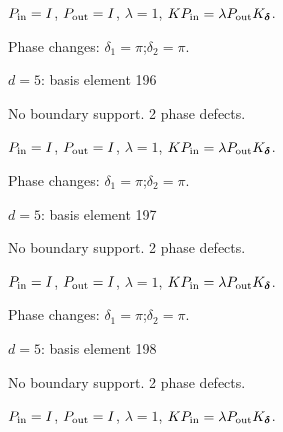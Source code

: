 \vspace{-1mm}
$P_{\rm in}=I$, \quad $P_{\rm out}=I$, \quad $\lambda=1$, \qquad $K P_{\rm in}=\lambda P_{\rm out}K_{\boldsymbol\delta}$.
\par\smallskip\begin{minipage}{.98\linewidth}\small Phase changes: $\delta_{1}=\pi$;\quad $\delta_{2}=\pi$.\end{minipage}
\vfill
{\footnotesize\texttt{}}
\newpage
{}
{\Large $d=5$: basis element 196}\par
No boundary support. 2 phase defects.
\begin{center}
\end{center}
\vspace{-1mm}
$P_{\rm in}=I$, \quad $P_{\rm out}=I$, \quad $\lambda=1$, \qquad $K P_{\rm in}=\lambda P_{\rm out}K_{\boldsymbol\delta}$.
\par\smallskip\begin{minipage}{.98\linewidth}\small Phase changes: $\delta_{1}=\pi$;\quad $\delta_{2}=\pi$.\end{minipage}
\vfill
{\footnotesize\texttt{}}
\newpage
{}
{\Large $d=5$: basis element 197}\par
No boundary support. 2 phase defects.
\begin{center}
\end{center}
\vspace{-1mm}
$P_{\rm in}=I$, \quad $P_{\rm out}=I$, \quad $\lambda=1$, \qquad $K P_{\rm in}=\lambda P_{\rm out}K_{\boldsymbol\delta}$.
\par\smallskip\begin{minipage}{.98\linewidth}\small Phase changes: $\delta_{1}=\pi$;\quad $\delta_{2}=\pi$.\end{minipage}
\vfill
{\footnotesize\texttt{}}
\newpage
{}
{\Large $d=5$: basis element 198}\par
No boundary support. 2 phase defects.
\begin{center}
\end{center}
\vspace{-1mm}
$P_{\rm in}=I$, \quad $P_{\rm out}=I$, \quad $\lambda=1$, \qquad $K P_{\rm in}=\lambda P_{\rm out}K_{\boldsymbol\delta}$.
